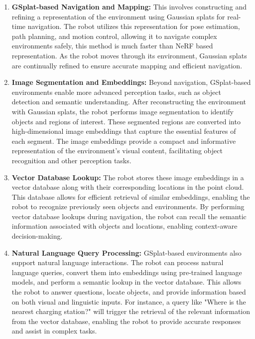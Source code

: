 \begin{enumerate}
      \item \textbf{GSplat-based Navigation and Mapping:} This involves constructing and refining a representation of the environment using Gaussian splats for real-time navigation. The robot utilizes this representation for pose estimation, path planning, and motion control, allowing it to navigate complex environments safely, this method is much faster than NeRF based representation. As the robot moves through its environment, Gaussian splats are continually refined to ensure accurate mapping and efficient navigation.

      \item \textbf{Image Segmentation and Embeddings:} Beyond navigation, GSplat-based environments enable more advanced perception tasks, such as object detection and semantic understanding. After reconstructing the environment with Gaussian splats, the robot performs image segmentation to identify objects and regions of interest. These segmented regions are converted into high-dimensional image embeddings that capture the essential features of each segment. The image embeddings provide a compact and informative representation of the environment's visual content, facilitating object recognition and other perception tasks.

      \item \textbf{Vector Database Lookup:} The robot stores these image embeddings in a vector database along with their corresponding locations in the point cloud. This database allows for efficient retrieval of similar embeddings, enabling the robot to recognize previously seen objects and environments. By performing vector database lookups during navigation, the robot can recall the semantic information associated with objects and locations, enabling context-aware decision-making.

      \item \textbf{Natural Language Query Processing:} GSplat-based environments also support natural language interactions. The robot can process natural language queries, convert them into embeddings using pre-trained language models, and perform a semantic lookup in the vector database. This allows the robot to answer questions, locate objects, and provide information based on both visual and linguistic inputs. For instance, a query like "Where is the nearest charging station?" will trigger the retrieval of the relevant information from the vector database, enabling the robot to provide accurate responses and assist in complex tasks.

\end{enumerate}

